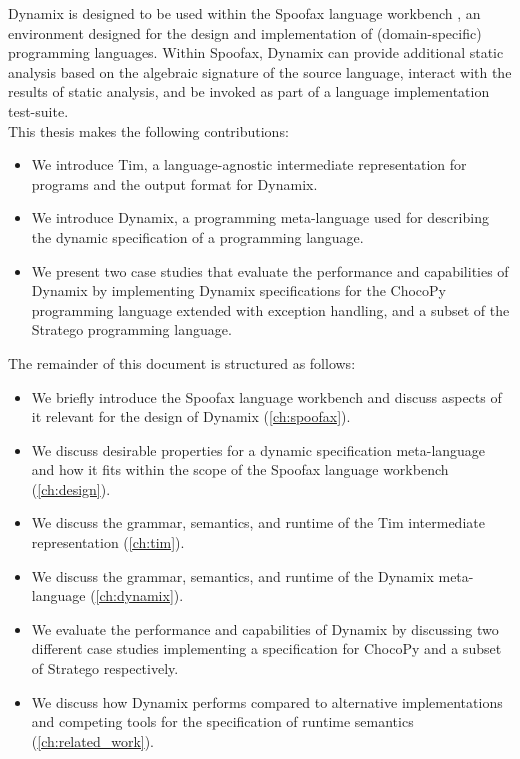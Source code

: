 Dynamix is designed to be used within the Spoofax language workbench \cite{Spoofax2021}, an environment designed for the design and implementation of (domain-specific) programming languages. Within Spoofax, Dynamix can provide additional static analysis based on the algebraic signature of the source language, interact with the results of static analysis, and be invoked as part of a language implementation test-suite.\\

\noindent This thesis makes the following contributions:

\begin{itemize}
  \item We introduce Tim, a language-agnostic intermediate representation for programs and the output format for Dynamix.
  \item We introduce Dynamix, a programming meta-language used for describing the dynamic specification of a programming language.
  \item We present two  case studies that evaluate the performance and capabilities of Dynamix by implementing Dynamix specifications for the ChocoPy programming language \cite{PhadyeSH19-SPLASHE} extended with exception handling, and a subset of the Stratego \cite{Visser05-SCAM} programming language.
\end{itemize}

\noindent The remainder of this document is structured as follows:

\begin{itemize}
  \item We briefly introduce the Spoofax language workbench and discuss aspects of it relevant for the design of Dynamix (\cref{ch:spoofax}).
  \item We discuss desirable properties for a dynamic specification meta-language and how it fits within the scope of the Spoofax language workbench (\cref{ch:design}).
  \item We discuss the grammar, semantics, and runtime of the Tim intermediate representation (\cref{ch:tim}).
  \item We discuss the grammar, semantics, and runtime of the Dynamix meta-language (\cref{ch:dynamix}).
  \item We evaluate the performance and capabilities of Dynamix by discussing two different case studies implementing a specification for ChocoPy \cite{PhadyeSH19-SPLASHE} and a subset of Stratego \cite{Visser05-SCAM} respectively.
  \item We discuss how Dynamix performs compared to alternative implementations and competing tools for the specification of runtime semantics (\cref{ch:related_work}).
\end{itemize}